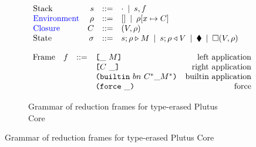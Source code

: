 \documentclass[../plutus-core-specification.tex]{subfiles}
\begin{document}
\begin{figure}[H]
\begin{subfigure}[c]{\linewidth}
    \centering
    \[\begin{array}{lrclr}
        \textrm{Stack} & s      & ::= & \cdot \enspace | \enspace s,f\\
 \textcolor{blue}{ \textrm{Environment}} & \rho & ::= & [] \enspace | \enspace \rho[x \mapsto C] \\
        \textcolor{blue}{ \textrm{Closure}} & C  & ::= & (V,\rho) \\
        \textrm{State} & \sigma & ::= & s;\rho \triangleright M \enspace | \enspace s;\rho \triangleleft V  \enspace | \enspace \blacklozenge{} \enspace | \enspace \square (V,\rho)\\
    \end{array}\]

    \label{fig:untyped-cek-frames}
\end{subfigure}
\begin{subfigure}[c]{\linewidth}
    \centering
    \[\begin{array}{lrclr}
        \textrm{Frame} & f  & ::=   & \texttt{[} \_ ~ M \texttt{]}          & \textrm{left application}\\
                       &   &     & \texttt{[} C ~ \_ \texttt{]}            & \textrm{right application}\\
                       &   &     & \texttt{(} \texttt{builtin} ~ bn ~ C^* \_ M^* \texttt{)}  & \textrm{builtin application}\\
                       &   &     & \texttt{(} \texttt{force} ~ \_ \texttt{)}                  & \textrm{force}
    \end{array}\]
    \caption{Grammar of reduction frames for type-erased Plutus Core}
    \label{fig:untyped-reduction-frames}
\end{subfigure}
\end{figure}
\end{document}
